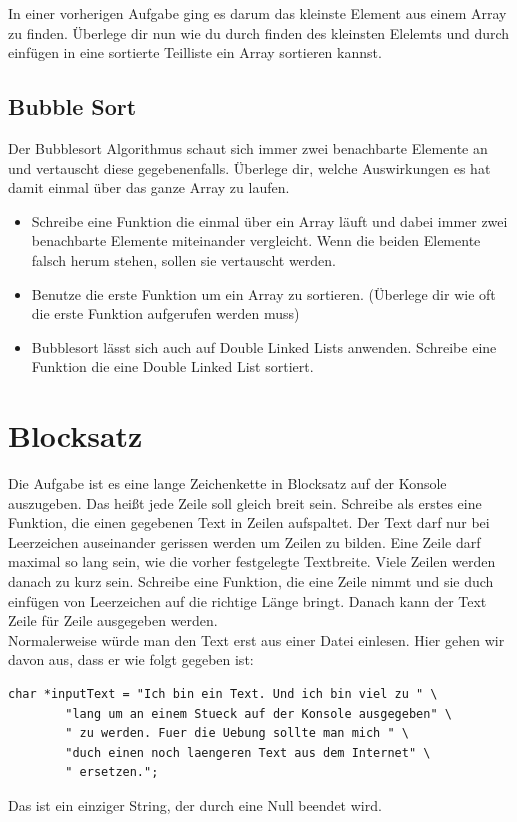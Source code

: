 \documentclass[c_worksheet.tex]{subfiles}
\begin{document}
In einer vorherigen Aufgabe ging es darum das kleinste Element aus einem Array zu finden. Überlege dir nun wie du durch finden des kleinsten Elelemts und durch einfügen in eine sortierte Teilliste ein Array sortieren kannst.

\subsection{Bubble Sort}

Der Bubblesort Algorithmus schaut sich immer zwei benachbarte Elemente an und vertauscht diese gegebenenfalls. Überlege dir, welche Auswirkungen es hat damit einmal über das ganze Array zu laufen.

\begin{itemize}
  \item Schreibe eine Funktion die einmal über ein Array läuft und dabei immer zwei benachbarte Elemente miteinander vergleicht. Wenn die beiden Elemente falsch herum stehen, sollen sie vertauscht werden.
  \item Benutze die erste Funktion um ein Array zu sortieren. (Überlege dir wie oft die erste Funktion aufgerufen werden muss)
  \item Bubblesort lässt sich auch auf Double Linked Lists anwenden. Schreibe eine Funktion die eine Double Linked List sortiert.
\end{itemize}

\section{Blocksatz}

Die Aufgabe ist es eine lange Zeichenkette in Blocksatz auf der Konsole auszugeben. Das heißt jede Zeile soll gleich breit sein. Schreibe als erstes eine Funktion, die einen gegebenen Text in Zeilen aufspaltet. Der Text darf nur bei Leerzeichen auseinander gerissen werden um Zeilen zu bilden. Eine Zeile darf maximal so lang sein, wie die vorher festgelegte Textbreite. Viele Zeilen werden danach zu kurz sein. Schreibe eine Funktion, die eine Zeile nimmt und sie duch einfügen von Leerzeichen auf die richtige Länge bringt. Danach kann der Text Zeile für Zeile ausgegeben werden.\\

Normalerweise würde man den Text erst aus einer Datei einlesen. Hier gehen wir davon aus, dass er wie folgt gegeben ist:
\begin{lstlisting}[numbers=none]
char *inputText = "Ich bin ein Text. Und ich bin viel zu " \
        "lang um an einem Stueck auf der Konsole ausgegeben" \
        " zu werden. Fuer die Uebung sollte man mich " \
        "duch einen noch laengeren Text aus dem Internet" \
        " ersetzen.";
\end{lstlisting}
Das ist ein einziger String, der durch eine Null beendet wird.
\end{document}
